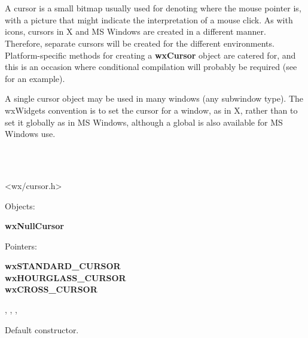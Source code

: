 \section{}\label{wxcursor}

A cursor is a small bitmap usually used for denoting where the mouse
pointer is, with a picture that might indicate the interpretation of a
mouse click. As with icons, cursors in X and MS Windows are created
in a different manner. Therefore, separate cursors will be created for the
different environments.  Platform-specific methods for creating a {\bf
wxCursor} object are catered for, and this is an occasion where
conditional compilation will probably be required (see  for
an example).

A single cursor object may be used in many windows (any subwindow type).
The wxWidgets convention is to set the cursor for a window, as in X,
rather than to set it globally as in MS Windows, although a
global  is also available for MS Windows use.


\\
\\


<wx/cursor.h>


Objects:

{\bf wxNullCursor}

Pointers:

{\bf wxSTANDARD\_CURSOR\\
wxHOURGLASS\_CURSOR\\
wxCROSS\_CURSOR}


, , ,\rtfsp
{}


\label{wxcursorctor}


Default constructor.


